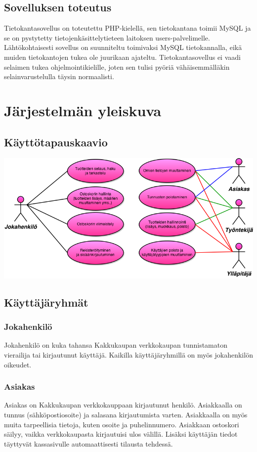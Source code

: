 \documentclass[a4paper,12pt, titlepage]{article}
\begin{document}
\subsection*{Sovelluksen toteutus}
Tietokantasovellus on toteutettu PHP-kielellä, sen tietokantana toimii MySQL ja se on pystytetty tietojenkäsittelytieteen laitoksen users-palvelimelle. Lähtökohtaisesti sovellus on suunniteltu toimivaksi MySQL tietokannalla, eikä muiden tietokantojen tukea ole juurikaan ajateltu. Tietokantasovellus ei vaadi selaimen tukea ohjelmointikielille, joten sen tulisi pyöriä vähäisemmälläkin selainvarustelulla täysin normaalisti.

\section{Järjestelmän yleiskuva}
\subsection{Käyttötapauskaavio}
\hfill

\noindent
\includegraphics[keepaspectratio, width=\textwidth]{kaaviot/kayttotapauskaavio.png}
\subsection{Käyttäjäryhmät}
\subsubsection*{Jokahenkilö}
Jokahenkilö on kuka tahansa Kakkukaupan verkkokaupan tunnistamaton vierailija tai kirjautunut käyttäjä. Kaikilla käyttäjäryhmillä on myös jokahenkilön oikeudet.
\subsubsection*{Asiakas}
Asiakas on Kakkukaupan verkkokauppaan kirjautunut henkilö. Asiakkaalla on tunnus 	(sähköpostiosoite) ja salasana kirjautumista varten. Asiakkaalla on myös muita tarpeellisia tietoja, kuten osoite ja puhelinnumero. Asiakkaan ostoskori säilyy, vaikka verkkokaupasta kirjautuisi ulos välillä. Lisäksi käyttäjän tiedot täyttyvät kassasivulle automaattisesti tilausta tehdessä.
\end{document}

